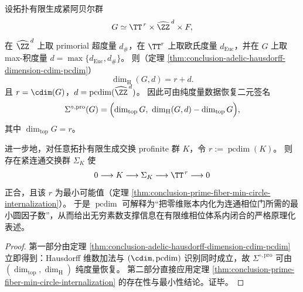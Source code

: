 \begin{conclusion}\label{con:xi-sigma-circ-pro-metric-characterization-finite-dimensional-closure}
设拓扑有限生成紧阿贝尔群
\[
G\simeq \TT^{\,r}\times\widehat{\ZZ}^{\,d}\times F,
\]
在 \(\widehat{\ZZ}^{\,d}\) 上取 primorial 超度量 \(d_{\#}\)，在 \(\TT^r\) 上取欧氏度量 \(d_{\mathrm{Euc}}\)，并在 \(G\) 上取 max-积度量 \(d=\max\{d_{\mathrm{Euc}},d_{\#}\}\)。
则（定理 \ref{thm:conclusion-adelic-hausdorff-dimension-cdim-pcdim}）
\[
\dim_{\mathrm H}(G,d)=r+d.
\]
且 \(r=\cdim(G)\)，\(d=\operatorname{pcdim}(\widehat{\ZZ}^{\,d})\)。
因此可由纯度量数据恢复二元签名
\[
\Sigma^{\circ,\mathrm{pro}}(G)
=
\Bigl(\dim_{\mathrm{top}}G,\ \dim_{\mathrm H}(G,d)-\dim_{\mathrm{top}}G\Bigr),
\]
其中 \(\dim_{\mathrm{top}}G=r\)。
\par
进一步地，对任意拓扑有限生成交换 profinite 群 \(K\)，令
\(
r:=\operatorname{pcdim}(K)
\)。
则存在紧连通交换群 \(\Sigma_K\) 使
\[
0\longrightarrow K\longrightarrow \Sigma_K\longrightarrow \TT^{\,r}\longrightarrow 0
\]
正合，且该 \(r\) 为最小可能值（定理 \ref{thm:conclusion-prime-fiber-min-circle-internalization}）。
于是 \(\operatorname{pcdim}\) 可解释为“把零维账本内化为连通相位门所需的最小圆因子数”，从而给出无穷素数支撑信息在有限维相位体系内闭合的严格原理化表述。
\end{conclusion}
\begin{proof}
第一部分由定理 \ref{thm:conclusion-adelic-hausdorff-dimension-cdim-pcdim} 立即得到：Hausdorff 维数加法与 \((\cdim,\operatorname{pcdim})\) 识别同时成立，故 \(\Sigma^{\circ,\mathrm{pro}}\) 可由 \((\dim_{\mathrm{top}},\dim_{\mathrm H})\) 纯度量恢复。
第二部分直接应用定理 \ref{thm:conclusion-prime-fiber-min-circle-internalization} 的存在性与最小性结论。证毕。
\end{proof}

\endinput
